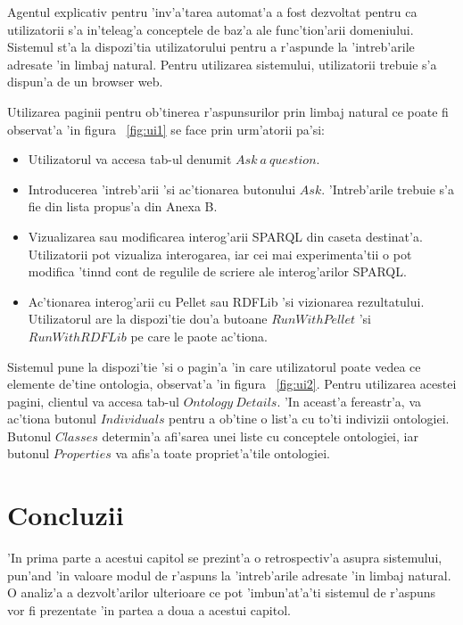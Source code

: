 \documentclass[12pt,a4paper,twoside]{report}
\begin{document}
Agentul explicativ pentru 'inv'a'tarea automat'a a fost dezvoltat pentru ca utilizatorii s'a in'teleag'a conceptele de baz'a ale func'tion'arii domeniului. Sistemul st'a la dispozi'tia utilizatorului pentru a r'aspunde la 'intreb'arile adresate 'in limbaj natural. Pentru utilizarea sistemului, utilizatorii trebuie s'a dispun'a de un browser web. 

Utilizarea paginii pentru ob'tinerea r'aspunsurilor prin limbaj natural ce poate fi observat'a 'in figura ~\ref{fig:ui1} se face prin urm'atorii pa'si:
\begin{itemize}
    \item Utilizatorul va accesa tab-ul denumit $Ask\ a\ question$.
    \item Introducerea 'intreb'arii 'si ac'tionarea butonului $Ask$. 'Intreb'arile trebuie s'a fie din lista propus'a din Anexa B. 
    \item Vizualizarea sau modificarea interog'arii SPARQL din caseta destinat'a. Utilizatorii pot vizualiza interogarea, iar cei mai experimenta'tii o pot modifica 'tin\ia nd cont de regulile de scriere ale interog'arilor SPARQL.
    \item Ac'tionarea interog'arii cu Pellet sau RDFLib 'si vizionarea rezultatului. Utilizatorul are la dispozi'tie dou'a butoane $RunWithPellet$ 'si $RunWithRDFLib$ pe care le paote ac'tiona.
\end{itemize}

Sistemul pune la dispozi'tie 'si o pagin'a 'in care utilizatorul poate vedea ce elemente de'tine ontologia, observat'a 'in figura ~\ref{fig:ui2}. Pentru utilizarea acestei pagini, clientul va accesa tab-ul $Ontology\ Details$. 'In aceast'a fereastr'a, va ac'tiona butonul $Individuals$ pentru a ob'tine o list'a cu to'ti indivizii ontologiei. Butonul $Classes$ determin'a afi'sarea unei liste cu conceptele ontologiei, iar butonul $Properties$ va afis'a toate propriet'a'tile ontologiei.

\chapter{Concluzii}
'In prima parte a acestui capitol se prezint'a o retrospectiv'a asupra sistemului, pun'and 'in valoare modul de r'aspuns la 'intreb'arile adresate 'in limbaj natural. O analiz'a a dezvolt'arilor ulterioare ce pot 'imbun'at'a'ti sistemul de r'aspuns vor fi prezentate 'in partea a doua a acestui capitol.
\end{document}

